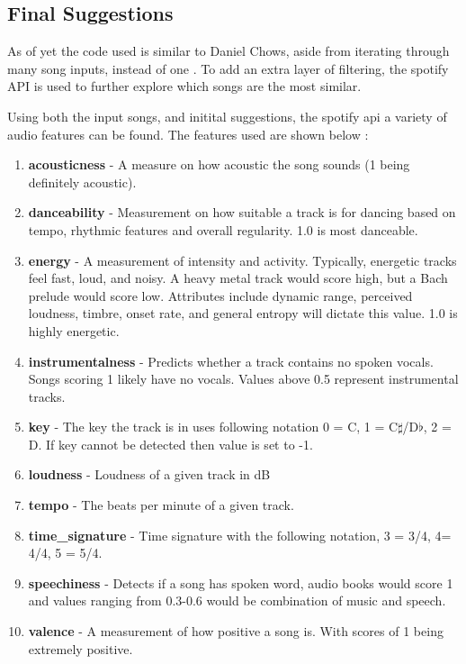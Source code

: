 \subsection{Final Suggestions}
As of yet the code used is similar to Daniel Chows, aside from iterating through many song inputs, instead of one \citep{chow_music_2020}. To add an extra layer of filtering, the spotify API is used to further explore which songs are the most similar.

Using both the input songs, and initital suggestions, the spotify api a variety of audio features can be found. The features used are shown below \citep{spotify_web_2023}:

\begin{enumerate}
	\item \textbf{acousticness} - A measure on how acoustic the song sounds (1 being definitely acoustic).
	\item \textbf{danceability} - Measurement on how suitable a track is for dancing based on tempo, rhythmic features and overall regularity. 1.0 is most danceable. 
	\item \textbf{energy} - A measurement of intensity and activity. Typically, energetic tracks feel fast, loud, and noisy. A heavy metal track would score high, but a Bach prelude would score low. Attributes include dynamic range, perceived loudness, timbre, onset rate, and general entropy will dictate this value. 1.0 is highly energetic.
	\item \textbf{instrumentalness} - Predicts whether a track contains no spoken vocals. Songs scoring 1 likely have no vocals. Values above 0.5 represent instrumental tracks.
	\item \textbf{key} - The key the track is in uses following notation 0 = C, 1 = C$\sharp$/D$\flat$, 2 = D. If key cannot be detected then value is set to -1.
	\item \textbf{loudness} - Loudness of a given track in dB
	\item \textbf{tempo} - The beats per minute of a given track.
	\item \textbf{time\_signature} - Time signature with the following notation, 3 = 3/4, 4= 4/4, 5 = 5/4.
	\item \textbf{speechiness} - Detects if a song has spoken word, audio books would score 1 and values ranging from 0.3-0.6 would be combination of music and speech.
	\item \textbf{valence} - A measurement of how positive a song is. With scores of 1 being extremely positive.
	
\end{enumerate}

